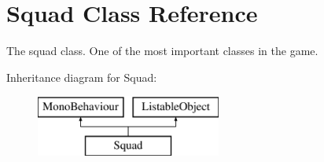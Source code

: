\hypertarget{class_squad}{}\section{Squad Class Reference}
\label{class_squad}


The squad class. One of the most important classes in the game.  


Inheritance diagram for Squad\+:\begin{figure}[H]
\begin{center}
\leavevmode
\includegraphics[height=2.000000cm]{class_squad}
\end{center}
\end{figure}
